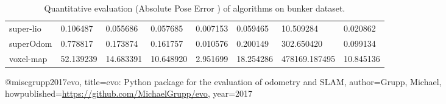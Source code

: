 \begin{table}[]
{\begin{tabular}{llllllll}
		super-lio & 0.106487 & 0.055686 & 0.057685 & 0.007153 & 0.059465 & 10.509284 & 0.020862 \\
		superOdom & 0.778817 & 0.173874 & 0.161757 & 0.010576 & 0.200149 & 302.650420 & 0.099134 \\
		voxel-map & 52.139239 & 14.683391 & 10.648920 & 2.951699 & 18.254286 & 478169.187495 & 10.845136 \\
        	\end{tabular}%
        }
        	\caption{Quantitative evaluation (Absolute Pose Error \cite{grupp2017evo}) of algorithms on bunker dataset.}
        	\label{table3}
\end{table}

@misc{grupp2017evo,
  title={evo: Python package for the evaluation of odometry and SLAM},
  author={Grupp, Michael},
  howpublished={\url{https://github.com/MichaelGrupp/evo}},
  year={2017}
}
